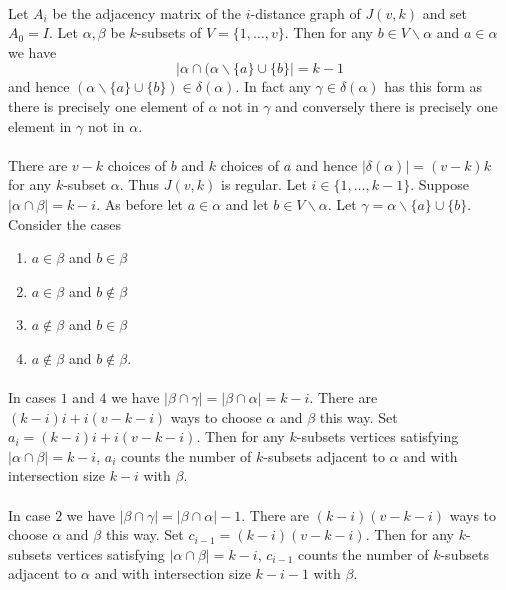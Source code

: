 \documentclass[letterpaper,12pt,oneside,onecolumn]{article}
\newcommand{\1}{\mathbbm{1}}
\begin{document}
\paragraph{}
Let $A_i$ be the adjacency matrix of the $i$-distance graph of $J(v,k)$ and set $A_0 = I$. Let $\alpha, \beta$ be $k$-subsets of $V = \{1, \dots, v\}$. Then for any $b \in V \backslash \alpha$ and $a \in \alpha$ we have
$$|\alpha \cap (\alpha \backslash \{a\} \cup \{b\}| = k -1$$
and hence $(\alpha \backslash \{a\} \cup \{b\}) \in \delta(\alpha)$. In fact any $\gamma \in \delta(\alpha)$ has this form as there is precisely one element of $\alpha$ not in $\gamma$ and conversely there is precisely one element in $\gamma$ not in $\alpha$.
\paragraph{}
There are $v-k$ choices of $b$ and $k$ choices of $a$ and hence $|\delta(\alpha)| = (v-k)k$ for any $k$-subset $\alpha$. Thus $J(v,k)$ is regular. Let $i \in \{1,\dots, k-1\}$. Suppose $|\alpha \cap \beta| = k-i$. As before let $a \in \alpha$ and let $b \in V \backslash \alpha$. Let $\gamma = \alpha \backslash\{a\} \cup \{b\}$. Consider the cases
\begin{enumerate}
\item $a \in \beta$ and $b \in \beta$
\item $a \in \beta$ and $b \not\in \beta$
\item $a\not\in \beta$ and $b\in \beta$
\item $a\not\in \beta$ and $b \not\in \beta$.
\end{enumerate}
\paragraph{}
In cases $1$ and $4$ we have $|\beta \cap \gamma | = |\beta \cap \alpha| = k-i$. There are $(k-i)i + i(v-k-i)$ ways to choose $\alpha$ and $\beta$ this way. Set $a_i = (k-i)i + i(v-k-i)$. Then for any $k$-subsets vertices satisfying $|\alpha \cap \beta| = k-i$, $a_i$ counts the number of $k$-subsets adjacent to $\alpha$ and with intersection size $k-i$ with $\beta$.
\paragraph{}
In case $2$ we have $|\beta \cap \gamma | = |\beta \cap \alpha| -1$. There are $(k-i)(v-k-i)$ ways to choose $\alpha$ and $\beta$ this way. Set $c_{i-1} = (k-i)(v-k-i)$. Then for any $k$-subsets vertices satisfying $|\alpha \cap \beta| = k-i$, $c_{i-1}$ counts the number of $k$-subsets adjacent to $\alpha$ and with intersection size $k-i-1$ with $\beta$.
\end{document}
